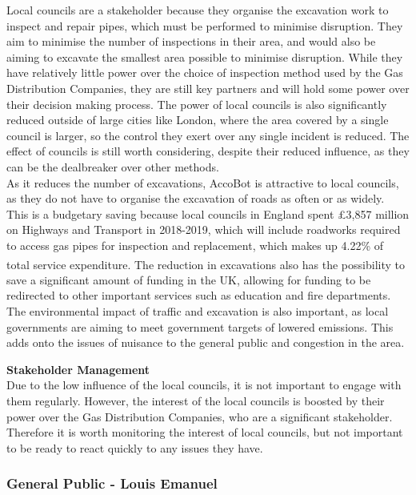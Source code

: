 \documentclass[11pt]{article}		%
\newcommand{\supercite}[1]{\textsuperscript{\cite{#1}}}		%
\begin{document}
			Local councils are a stakeholder because they organise the excavation work to inspect and repair pipes, which must be performed to minimise disruption.
			They aim to minimise the number of inspections in their area, and would also be aiming to excavate the smallest area possible to minimise disruption.
			While they have relatively little power over the choice of inspection method used by the Gas Distribution Companies, they are still key partners and will hold some power over their decision making process.
			The power of local councils is also significantly reduced outside of large cities like London, where the area covered by a single council is larger, so the control they exert over any single incident is reduced.
			The effect of councils is still worth considering, despite their reduced influence, as they can be the dealbreaker over other methods.
			\\
            \hspace*{2ex}As it reduces the number of excavations, AccoBot is attractive to local councils, as they do not have to organise the excavation of roads as often or as widely.
			This is a budgetary saving because local councils in England spent £3,857 million on Highways and Transport in 2018-2019, which will include roadworks required to access gas pipes for inspection and replacement, which makes up 4.22\% of total service expenditure\supercite{ministry2020local}.
			The reduction in excavations also has the possibility to save a significant amount of funding in the UK, allowing for funding to be redirected to other important services such as education and fire departments.
			The environmental impact of traffic and excavation is also important, as local governments are aiming to meet government targets of lowered emissions.
			This adds onto the issues of nuisance to the general public and congestion in the area.
			 
		    \textbf{Stakeholder Management}
		    \\
		    Due to the low influence of the local councils, it is not important to engage with them regularly.
		    However, the interest of the local councils is boosted by their power over the Gas Distribution Companies, who are a significant stakeholder.
		    Therefore it is worth monitoring the interest of local councils, but not important to be ready to react quickly to any issues they have.
		
		\subsubsection[General Public]{General Public - Louis Emanuel}
		
\end{document}
